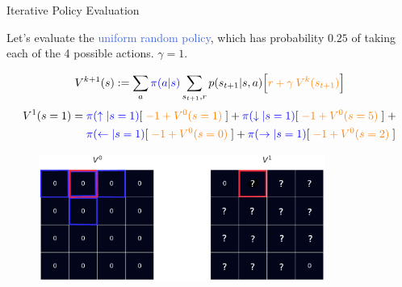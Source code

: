 \documentclass{beamer}
\begin{document}
\begin{frame}{Iterative Policy Evaluation}

\begin{footnotesize}

Let's evaluate the \textcolor{RoyalBlue}{uniform random policy}, which has probability $0.25$ of taking each of the 4 possible actions. $\gamma = 1$.

\begin{align*}
    V^{k+1}(s) := \sum_a \textcolor{blue}{\pi(a|s)} \sum_{s_{t+1},r} p(s_{t+1}|s,a)\Big[\textcolor{orange}{r+\gamma\:V^k(s_{t+1})}\Big]
\end{align*}
\begin{align*}
	V^1(s = 1) = \; & \textcolor{blue}{\pi(\uparrow|s=1)}[\;\textcolor{orange}{-1 + V^0(s=1)}\;] + \textcolor{blue}{\pi(\downarrow|s=1)}[\; \textcolor{orange}{-1+ V^0(s=5)}\; ] \; + \\
	&\textcolor{blue}{\pi(\leftarrow|s=1)}[\;\textcolor{orange}{-1+ V^0(s=0)}\;] + \textcolor{blue}{\pi(\rightarrow|s=1)}[\;\textcolor{orange}{-1+ V^0(s=2)}\;]
\end{align*}

\end{footnotesize}

\begin{figure}[t]
\includegraphics[width=9.4cm]{./images/step00_bis2.png}
\centering
\end{figure}

\end{frame}
\end{document}
